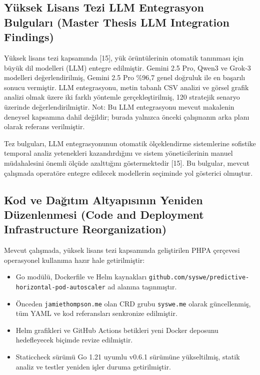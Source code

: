 \documentclass[12pt,a4paper]{article}
\begin{document}
\subsection{Yüksek Lisans Tezi LLM Entegrasyon Bulguları (Master Thesis LLM Integration Findings)}

Yüksek lisans tezi kapsamında [15], yük örüntülerinin otomatik tanınması için büyük dil modelleri (LLM) entegre edilmiştir. Gemini 2.5 Pro, Qwen3 ve Grok-3 modelleri değerlendirilmiş, Gemini 2.5 Pro \%96,7 genel doğruluk ile en başarılı sonucu vermiştir. LLM entegrasyonu, metin tabanlı CSV analizi ve görsel grafik analizi olmak üzere iki farklı yöntemle gerçekleştirilmiş, 120 stratejik senaryo üzerinde değerlendirilmiştir. Not: Bu LLM entegrasyonu mevcut makalenin deneysel kapsamına dahil değildir; burada yalnızca önceki çalışmanın arka planı olarak referans verilmiştir.

Tez bulguları, LLM entegrasyonunun otomatik ölçeklendirme sistemlerine sofistike temporal analiz yetenekleri kazandırdığını ve sistem yöneticilerinin manuel müdahalesini önemli ölçüde azalttığını göstermektedir [15]. Bu bulgular, mevcut çalışmada operatöre entegre edilecek modellerin seçiminde yol gösterici olmuştur.

\subsection{Kod ve Dağıtım Altyapısının Yeniden Düzenlenmesi (Code and Deployment Infrastructure Reorganization)}

Mevcut çalışmada, yüksek lisans tezi kapsamında geliştirilen PHPA çerçevesi operasyonel kullanıma hazır hale getirilmiştir:

\begin{itemize}[noitemsep]
  \item Go modülü, Dockerfile ve Helm kaynakları \texttt{github.com/syswe/predictive-horizontal-pod-autoscaler} ad alanına taşınmıştır.
  \item Önceden \texttt{jamiethompson.me} olan CRD grubu \texttt{syswe.me} olarak güncellenmiş, tüm YAML ve kod referansları senkronize edilmiştir.
  \item Helm grafikleri ve GitHub Actions betikleri yeni Docker deposunu hedefleyecek biçimde revize edilmiştir.
  \item Staticcheck sürümü Go 1.21 uyumlu v0.6.1 sürümüne yükseltilmiş, statik analiz ve testler yeniden işler duruma getirilmiştir.
\end{itemize}
\end{document}
